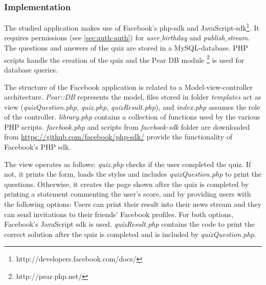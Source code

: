 \documentclass[preprint,12pt]{elsarticle}
\begin{document}
\subsubsection{Implementation}
\label{sec:implementation}
The studied application makes use of 
Facebook's php-\ac{sdk} and JavaScript-\ac{sdk}\footnote{http://developers.facebook.com/docs/}. It requires
permissions (see \ref{sec:auth-auth}) for \textit{user$\_$birthday} and
\textit{publish$\_$stream}.
The questions and answers of the quiz are stored in a MySQL-database. PHP scripts
handle the creation of the quiz and
the Pear DB module \footnote{http://pear.php.net/} is used
for database queries.

The structure of the Facebook application is related to a
Model-view-controller architecture. \textit{Pear::DB} represents the
model, files stored in folder \textit{templates} act as view
(\textit{quizQuestion.php}, \textit{quiz.php},
\textit{quizResult.php}), and \textit{index.php} assumes the role of
the controller. \textit{library.php} contains a collection of
functions used by the various PHP scripts. \textit{facebook.php} and
scripts from \textit{facebook-sdk} folder are downloaded from
\url{https://github.com/facebook/php-sdk/} provide the functionality
of Facebook's PHP \ac{sdk}.

The view operates as follows: \textit{quiz.php} checks if the user
completed the quiz. If not, it prints the form, loads the styles and
includes \textit{quizQuestion.php} to print the questions. Otherwise, it
creates the page shown after the quiz is completed by printing a
statement commenting the user's score, and by providing users with 
the following options: Users can print their result into their news
stream and they can send invitations to their friends' Facebook
profiles. For both options, Facebook's JavaScript \ac{sdk} is
used. \textit{quizResult.php} contains the code to  
print the correct solution after the quiz is completed and is included
by \textit{quizQuestion.php}. 
\end{document}
